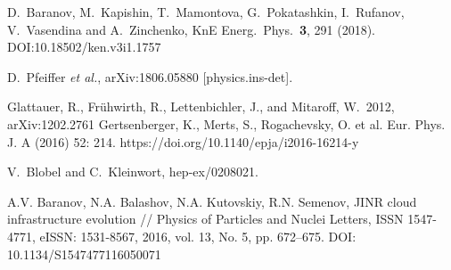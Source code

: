 \documentclass{webofc}
\begin{document}
\begin{thebibliography}{}
  D.~Baranov, M.~Kapishin, T.~Mamontova, G.~Pokatashkin, I.~Rufanov, V.~Vasendina and A.~Zinchenko,
  KnE Energ.\ Phys.\  {\bf 3}, 291 (2018).
  DOI:10.18502/ken.v3i1.1757
 

  D.~Pfeiffer {\it et al.},
  arXiv:1806.05880 [physics.ins-det].
  
 Glattauer, R., Fr{\"u}hwirth, R., Lettenbichler, J., and Mitaroff, W.\ 2012, arXiv:1202.2761
 Gertsenberger, K., Merts, S., Rogachevsky, O. et al. Eur. Phys. J. A (2016) 52: 214. https://doi.org/10.1140/epja/i2016-16214-y
  
  V.~Blobel and C.~Kleinwort,
  hep-ex/0208021.

 A.V. Baranov,  N.A. Balashov, N.A. Kutovskiy, R.N. Semenov, JINR cloud infrastructure evolution // Physics of Particles and Nuclei Letters,
  ISSN 1547-4771, eISSN: 1531-8567, 2016, vol. 13, No. 5, pp. 672–675. DOI: 10.1134/S1547477116050071
\end{thebibliography}
\end{document}
